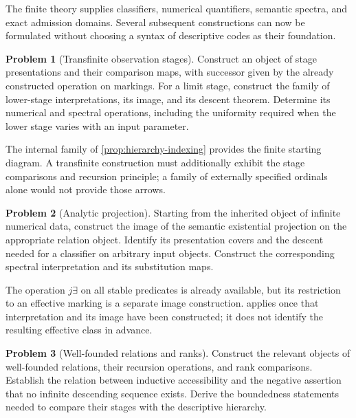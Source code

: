 \documentclass[11pt,a4paper]{article}
\numberwithin{equation}{section}
\theoremstyle{definition}
\newtheorem{problem}[problem]{Problem}
\theoremstyle{remark}
\theoremstyle{plain}
\begin{document}
The finite theory supplies classifiers, numerical quantifiers, semantic
spectra, and exact admission domains. Several subsequent constructions
can now be formulated without choosing a syntax of descriptive codes
as their foundation.

\begin{problem}[Transfinite observation stages]
\label{prob:transfinite}
Construct an object of stage presentations and their comparison maps,
with successor given by the already constructed operation on markings.
For a limit stage, construct the family of lower-stage interpretations,
its image, and its descent theorem. Determine its numerical and spectral
operations, including the uniformity required when the lower stage
varies with an input parameter.
\end{problem}

The internal family of \cref{prop:hierarchy-indexing} provides the
finite starting diagram. A transfinite construction must additionally
exhibit the stage comparisons and recursion principle; a family of
externally specified ordinals alone would not provide those arrows.

\begin{problem}[Analytic projection]
\label{prob:analytic}
Starting from the inherited object of infinite numerical data, construct
the image of the semantic existential projection on the appropriate
relation object. Identify its presentation covers and the descent
needed for a classifier on arbitrary input objects. Construct the
corresponding spectral interpretation and its substitution maps.
\end{problem}

The operation $j\exists$ on all stable predicates is already available,
but its restriction to an effective marking is a separate image
construction.  applies once that
interpretation and its image have been constructed; it does not
identify the resulting effective class in advance.

\begin{problem}[Well-founded relations and ranks]
\label{prob:ranks}
Construct the relevant objects of well-founded relations, their
recursion operations, and rank comparisons. Establish the relation
between inductive accessibility and the negative assertion that no
infinite descending sequence exists. Derive the boundedness statements
needed to compare their stages with the descriptive hierarchy.
\end{problem}
\end{document}

